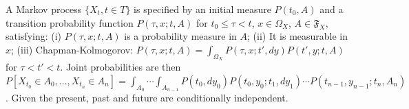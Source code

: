 A Markov process $\{X_t, t \in T\}$ is specified by an initial measure $P(t_0, A)$ and a transition probability function $P(\tau, x; t, A)$ for $t_0 \leq \tau < t$, $x \in \Omega_X$, $A \in \mathfrak{F}_X$, satisfying:
(i) $P(\tau, x; t, A)$ is a probability measure in $A$;
(ii) It is measurable in $x$;
(iii) Chapman-Kolmogorov: $P(\tau, x; t, A) = \int_{\Omega_X} P(\tau, x; t', dy) P(t', y; t, A)$ for $\tau < t' < t$.
Joint probabilities are then $P[X_{t_0} \in A_0, \ldots, X_{t_n} \in A_n] = \int_{A_0} \cdots \int_{A_{n-1}} P(t_0, dy_0) P(t_0, y_0; t_1, dy_1) \cdots P(t_{n-1}, y_{n-1}; t_n, A_n)$. Given the present, past and future are conditionally independent.
